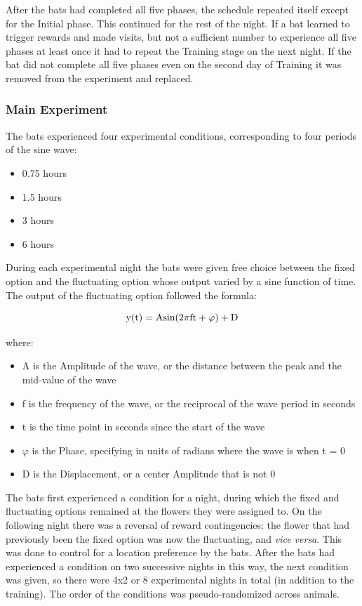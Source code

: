 \documentclass[
]{article}
\providecommand{\tightlist}{%
  \setlength{\itemsep}{0pt}\setlength{\parskip}{0pt}}
\begin{document}
After the bats had completed all five phases, the schedule repeated itself except for the Initial phase. This continued for the rest of the night. If a bat learned to trigger rewards and made visits, but not a sufficient number to experience all five phases at least once it had to repeat the Training stage on the next night. If the bat did not complete all five phases even on the second day of Training it was removed from the experiment and replaced.

\hypertarget{main-experiment}{%
\subsubsection{Main Experiment}\label{main-experiment}}

The bats experienced four experimental conditions, corresponding to four periods of the sine wave:

\begin{itemize}
\tightlist
\item
  0.75 hours
\item
  1.5 hours
\item
  3 hours
\item
  6 hours
\end{itemize}

During each experimental night the bats were given free choice between the fixed option and the fluctuating option whose output varied by a sine function of time. The output of the fluctuating option followed the formula:

\[ \mathrm{y(t)} = {\rm Asin(2\pi ft + \varphi) + D} \]

where:

\begin{itemize}
\tightlist
\item
  A is the Amplitude of the wave, or the distance between the peak and the mid-value of the wave
\item
  f is the frequency of the wave, or the reciprocal of the wave period in seconds
\item
  t is the time point in seconds since the start of the wave
\item
  \(\varphi\) is the Phase, specifying in units of radians where the wave is when t = 0
\item
  D is the Displacement, or a center Amplitude that is not 0
\end{itemize}

The bats first experienced a condition for a night, during which the fixed and fluctuating options remained at the flowers they were assigned to. On the following night there was a reversal of reward contingencies: the flower that had previously been the fixed option was now the fluctuating, and \emph{vice versa}. This was done to control for a location preference by the bats. After the bats had experienced a condition on two successive nights in this way, the next condition was given, so there were 4x2 or 8 experimental nights in total (in addition to the training). The order of the conditions was pseudo-randomized across animals.
\end{document}
